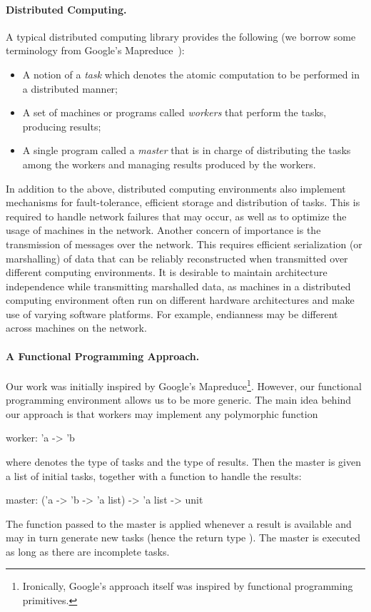 \documentclass[preprint]{sigplanconf}
\begin{document}
\paragraph{Distributed Computing.}
A typical distributed computing library provides the following (we
borrow some terminology from Google's Mapreduce~\cite{mapreduce}):
\begin{itemize}
\item A notion of a \emph{task} which denotes the atomic computation to be
  performed in a distributed manner;
\item A set of machines or programs called \emph{workers} that perform
  the tasks, producing results;
\item A single program called a \emph{master} that is in charge
  of distributing the tasks among the workers and managing results
  produced by the workers.
\end{itemize}
In addition to the above, distributed computing environments also
implement mechanisms for fault-tolerance, efficient storage and
distribution of tasks. This is required to handle network failures
that may occur, as well as to optimize the usage of machines in the
network. Another concern of importance is the transmission of messages
over the network. This requires efficient serialization (or
marshalling) of data that can be reliably reconstructed when
transmitted over different computing environments.  It is desirable to
maintain architecture independence while transmitting marshalled data,
as machines in a distributed computing environment often run on
different hardware architectures and make use of varying software
platforms. For example, endianness may be different across machines on
the network.

\paragraph{A Functional Programming Approach.}
Our work was initially inspired by Google's
Mapreduce\footnote{Ironically, Google's approach itself was inspired
  by functional programming primitives.}. However, our functional
programming environment allows us to be more generic. 
The main idea behind our approach is that
workers may implement any polymorphic function
\begin{ocaml}
  worker: 'a -> 'b
\end{ocaml}
where  denotes the type of tasks and  the type of results.
Then the master is given a list of initial tasks, together with a
function to handle the results:
\begin{ocaml}
  master: ('a -> 'b -> 'a list) -> 'a list -> unit
\end{ocaml}
The function passed to the master is applied whenever a result is
available and may in turn generate new tasks (hence the return type
).  The master is executed as long as there are incomplete
tasks.
\end{document}
